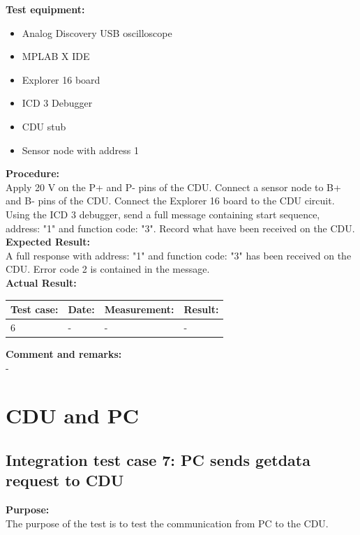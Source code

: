 \textbf{Test equipment:}
\begin{itemize}
\item Analog Discovery USB oscilloscope
\item MPLAB X IDE
\item Explorer 16 board
\item ICD 3 Debugger
\item CDU stub
\item Sensor node with address 1
\end{itemize}

\textbf{Procedure:}\\
Apply 20 V on the P+ and P- pins of the CDU. Connect a sensor node to B+ and B- pins of the CDU. Connect the Explorer 16 board to the CDU circuit. Using the ICD 3 debugger, send a full message containing start sequence, address: "1" and function code: "3". Record what have been received on the CDU.\\

\textbf{Expected Result:}\\
A full response with address: "1" and function code: "3" has been received on the CDU. Error code 2 is contained in the message.\\

\textbf{Actual Result:}\\
\begin{table}[H]
\centering
\begin{tabular}{|p{2cm}|p{2cm}|p{3cm}|p{2cm}|}\hline
\textbf{Test case:} & \textbf{Date:} & \textbf{Measurement:} & \textbf{Result:} \\ \hline
6 & - & - & - \\ \hline
\end{tabular}
\end{table}


\textbf{Comment and remarks:}\\
-\\


\section{CDU and PC}
\subsection{Integration test case 7: PC sends getdata request to CDU}
\textbf{Purpose:}\\
The purpose of the test is to test the communication from PC to the CDU.\\

